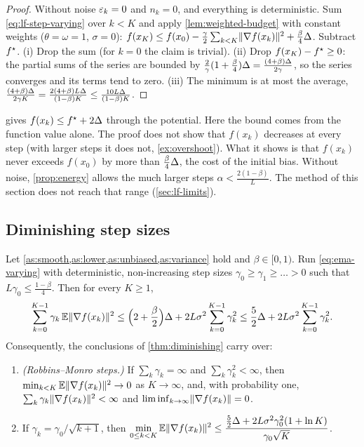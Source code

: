 \begin{proof}
Without noise $\varepsilon_k=0$ and $n_k=0$, and everything is deterministic. Sum
\eqref{eq:lf-step-varying} over $k<K$ and apply \cref{lem:weighted-budget} with constant
weights ($\theta=\omega=1$, $\sigma=0$):
$f(x_K)\le f(x_0)-\frac\gamma2\sum_{k<K}\lVert \nabla f(x_k)\rVert^2+\frac\beta4\Delta$. Subtract $f^\star$.
(i) Drop the sum (for $k=0$ the claim is trivial). (ii) Drop $f(x_K)-f^\star\ge0$: the partial
sums of the series are bounded by $\frac{2}{\gamma}(1+\frac\beta4)\Delta=\frac{(4+\beta)\Delta}{2\gamma}$,
so the series converges and its terms tend to zero. (iii) The minimum is at most the
average, $\frac{(4+\beta)\Delta}{2\gamma K}=\frac{2(4+\beta)L\Delta}{(1-\beta)K}\le\frac{10L\Delta}{(1-\beta)K}$.
\end{proof}

 gives $f(x_k)\le f^\star+2\Delta$ through the potential. Here the bound
comes from the function value alone. The proof does not show that $f(x_k)$ decreases at
every step (with larger steps it does not, \cref{ex:overshoot}). What it shows is that
$f(x_k)$ never exceeds $f(x_0)$ by more than $\frac\beta4\Delta$, the cost of the initial
bias. Without noise, \cref{prop:energy} allows the much larger steps
$\alpha<\frac{2(1-\beta)}{L}$. The method of this section does not reach that range
(\cref{sec:lf-limits}).

\subsection{Diminishing step sizes}

\begin{tcolorbox}[keybox]
\begin{theorem}\label{thm:lf-diminishing}
Let \cref{as:smooth,as:lower,as:unbiased,as:variance} hold and $\beta\in[0,1)$. Run
\eqref{eq:ema-varying} with deterministic, non-increasing step sizes $\gamma_0\ge\gamma_1\ge\dots>0$
such that $L\gamma_0\le\frac{1-\beta}{4}$. Then for every $K\ge1$,
\begin{equation}\label{eq:lf-diminishing}
  \sum_{k=0}^{K-1}\gamma_k\,\mathbb{E}\lVert \nabla f(x_k)\rVert^2\le\Bigl(2+\frac\beta2\Bigr)\Delta+2L\sigma^2\sum_{k=0}^{K-1}\gamma_k^2
  \le\frac52\Delta+2L\sigma^2\sum_{k=0}^{K-1}\gamma_k^2 .
\end{equation}
Consequently, the conclusions of \cref{thm:diminishing} carry over:
\begin{enumerate}[label=\textup{(\roman*)}]
\item \emph{(Robbins--Monro steps.)} If $\sum_k\gamma_k=\infty$ and $\sum_k\gamma_k^2<\infty$, then
  $\min_{k<K}\mathbb{E}\lVert \nabla f(x_k)\rVert^2\to0$ as $K\to\infty$, and, with probability one,
  $\sum_k\gamma_k\lVert \nabla f(x_k)\rVert^2<\infty$ and $\liminf_{k\to\infty}\lVert \nabla f(x_k)\rVert=0$.
\item If $\gamma_k=\gamma_0/\sqrt{k+1}$, then
  $\displaystyle\min_{0\le k<K}\mathbb{E}\lVert \nabla f(x_k)\rVert^2\le\frac{\frac52\Delta+2L\sigma^2\gamma_0^2(1+\ln K)}{\gamma_0\sqrt K}$.
\end{enumerate}
\end{theorem}
\end{tcolorbox}

